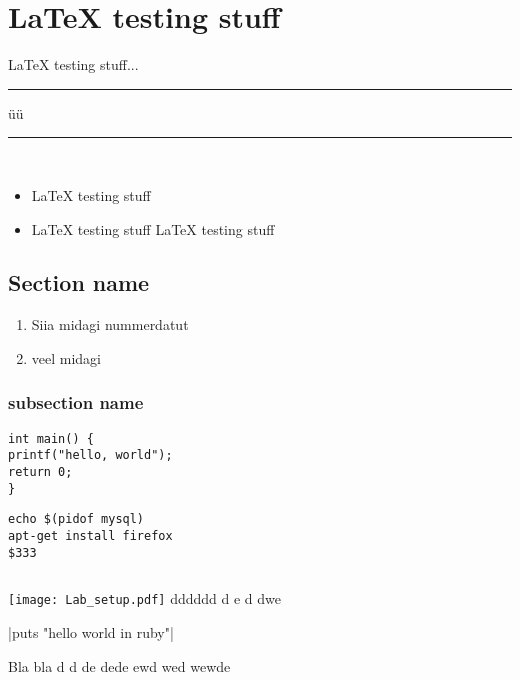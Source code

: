 \chapter{LaTeX testing stuff}
\label{LaTeX testing stuff}
LaTeX testing stuff...
\rule{2.6cm}{0.75pt}  \hspace{3cm} üü \rule{3cm}{0.75pt}\\[2cm]
\begin{itemize}
	\item LaTeX testing stuff
	\item LaTeX testing stuff LaTeX testing stuff
\end{itemize}


\section{Section name}
\begin{enumerate}
	\item Siia midagi nummerdatut
	\item veel midagi
\end{enumerate}
\subsection{subsection name}


\begin{verbatim}
int main() {
printf("hello, world");
return 0;
}
\end{verbatim}
\begin{verbatim}
echo $(pidof mysql)
apt-get install firefox
$333
\end{verbatim}
\inputminted{sh}{code/simple.sh}

\texttt{[image: Lab\_setup.pdf]}
dddddd d  e d dwe \

|puts "hello world in ruby"|\

\cite{website:ssl} Bla bla
\citep{book:code-complete} d  d
\citep{OppeArenduskeskus2010} de dede
\cite{url:pulse} ewd wed
\citep{SecEngineering} wewde
